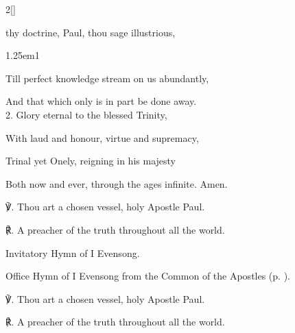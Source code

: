 \begin{paracol}{2}[]
\sloppy

\firstEvensong


\firstEvensongHymn\label{PaulEvensong}

 thy doctrine, Paul, thou sage illustrious,


\begin{hangparas}{1.25em}{1}

Till perfect knowledge stream on us abundantly,

And that which only is in part be done away.\\

2. Glory eternal to the blessed Trinity,

With laud and honour, virtue and supremacy,

Trinal yet Onely, reigning in his majesty

Both now and ever, through the ages infinite. Amen.\\
\end{hangparas}

℣. Thou art a chosen vessel, holy Apostle Paul.

℟. A preacher of the truth throughout all the world.


\switchcolumn

\mattins


\begin{rubric}
	Invitatory Hymn of I Evensong.
\end{rubric}

\begin{rubric}
	Office Hymn of I Evensong from the Common of the Apostles (p. \pageref{ApostlesEvensong}).
\end{rubric}

℣. Thou art a chosen vessel, holy Apostle Paul.

℟. A preacher of the truth throughout all the world.


\end{paracol}
